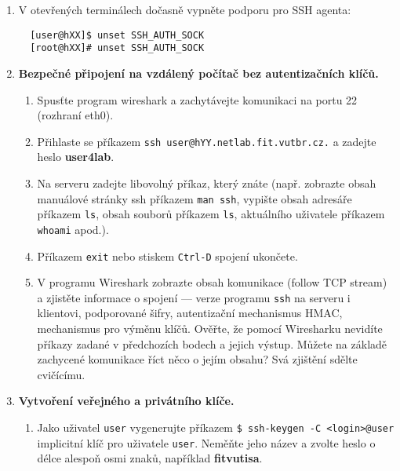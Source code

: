 \documentclass[a4paper,11pt]{article}
\begin{document}
\begin{enumerate}

  \item V otevřených terminálech dočasně vypněte podporu pro SSH agenta:
  \begin{lstlisting}
  [user@hXX]$ unset SSH_AUTH_SOCK
  [root@hXX]# unset SSH_AUTH_SOCK
  \end{lstlisting}

  \item {\bf Bezpečné připojení na vzdálený počítač bez autentizačních klíčů.}

    \begin{enumerate}

      \item Spusťte program wireshark a zachytávejte komunikaci na portu 22
        (rozhraní eth0).

      \item Přihlaste se příkazem {\tt ssh user@hYY.netlab.fit.vutbr.cz.} a zadejte heslo \textbf{user4lab}.

      \item Na serveru zadejte libovolný příkaz, který znáte (např. zobrazte
        obsah manuálové stránky ssh příkazem {\tt man ssh}, vypište
        obsah adresáře příkazem {\tt ls}, obsah souborů příkazem {\tt ls},
        aktuálního uživatele příkazem {\tt whoami} apod.).

      \item Příkazem {\tt exit} nebo stiskem {\tt Ctrl-D} spojení ukončete.

      \item V programu Wireshark zobrazte obsah komunikace (follow TCP stream) a
        zjistěte informace o spojení --- verze programu {\tt ssh} na serveru i
        klientovi, podporované šifry, autentizační mechanismus HMAC, mechanismus
        pro výměnu klíčů. Ověřte, že pomocí Wiresharku nevidíte příkazy zadané v
        předchozích bodech a jejich výstup. Můžete na základě zachycené
        komunikace říct něco o jejím obsahu? Svá zjištění sdělte cvičícímu.

    \end{enumerate}

  \item {\bf Vytvoření veřejného a privátního klíče.}

    \begin{enumerate}

      \item Jako uživatel {\tt user} vygenerujte příkazem \verb|$ ssh-keygen -C <login>@user|
        implicitní klíč pro uživatele
        {\tt user}. Neměňte jeho
        název a zvolte heslo o délce alespoň osmi znaků, například
        \textbf{fitvutisa}.


\end{enumerate}
\end{enumerate}
\end{document}
